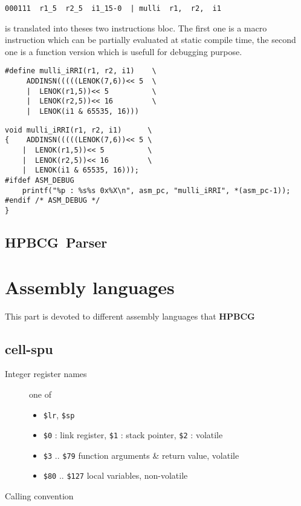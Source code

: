 \documentclass{article}
\newcommand{\hpbcg}{\textbf{HPBCG}\ }
\begin{document}
\begin{verbatim}
000111  r1_5  r2_5  i1_15-0  | mulli  r1,  r2,  i1
\end{verbatim}

is translated into theses two instructions bloc. The first one is a
macro instruction which can be partially evaluated at static compile
time, the second one is a function version which is usefull for
debugging purpose.

\begin{verbatim}
#define mulli_iRRI(r1, r2, i1)    \
     ADDINSN(((((LENOK(7,6))<< 5  \
     |  LENOK(r1,5))<< 5          \
     |  LENOK(r2,5))<< 16         \
     |  LENOK(i1 & 65535, 16)))
\end{verbatim}

\begin{verbatim}
void mulli_iRRI(r1, r2, i1)      \
{    ADDINSN(((((LENOK(7,6))<< 5 \
    |  LENOK(r1,5))<< 5          \
    |  LENOK(r2,5))<< 16         \
    |  LENOK(i1 & 65535, 16)));
#ifdef ASM_DEBUG
    printf("%p : %s%s 0x%X\n", asm_pc, "mulli_iRRI", *(asm_pc-1));
#endif /* ASM_DEBUG */
}
\end{verbatim}

\subsection{\hpbcg Parser}

\section{Assembly languages}

This part is devoted to different assembly languages that \hpbcg

\subsection{cell-spu}

\begin{description}
\item[Integer register names] one of
  \begin{itemize}
  \item \verb|$lr|, \verb|$sp|
  \item \verb|$0| : link register, \verb|$1| : stack pointer,
    \verb|$2| : volatile
  \item \verb|$3| .. \verb|$79| function arguments \& return value, volatile
  \item \verb|$80| .. \verb|$127| local variables, non-volatile
  \end{itemize}
\item[Calling convention] 
\end{description}
\end{document}

